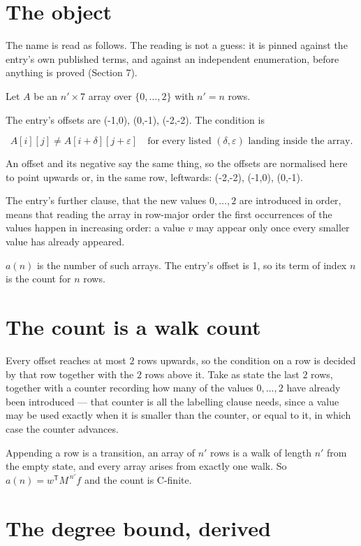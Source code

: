 \documentclass[11pt]{article}
\theoremstyle{definition}
\begin{document}
\section{The object}

The name is read as follows. The reading is not a guess: it is pinned against the entry's own published terms, and against an independent enumeration, before anything is proved (Section 7).

Let $A$ be an $n' \times 7$ array over $\{0,\dots,2\}$ with $n' = n$ rows.

The entry's offsets are (-1,0), (0,-1), (-2,-2). The condition is

\[A[i][j] \ne A[i{+}\delta][j{+}\varepsilon]\quad\text{for every listed }(\delta,\varepsilon)\text{ landing inside the array.}\]

An offset and its negative say the same thing, so the offsets are normalised here to point upwards or, in the same row, leftwards: (-2,-2), (-1,0), (0,-1).

The entry's further clause, that the new values $0,\dots,2$ are introduced in order, means that reading the array in row-major order the first occurrences of the values happen in increasing order: a value $v$ may appear only once every smaller value has already appeared.

$a(n)$ is the number of such arrays. The entry's offset is 1, so its term of index $n$ is the count for $n$ rows.

\section{The count is a walk count}

Every offset reaches at most $2$ rows upwards, so the condition on a row is decided by that row together with the $2$ rows above it. Take as state the last $2$ rows, together with a counter recording how many of the values $0,\dots,2$ have already been introduced --- that counter is all the labelling clause needs, since a value may be used exactly when it is smaller than the counter, or equal to it, in which case the counter advances.

Appending a row is a transition, an array of $n'$ rows is a walk of length $n'$ from the empty state, and every array arises from exactly one walk. So $a(n) = w^{\mathsf T}M^{\,n'}f$ and the count is C-finite.

\section{The degree bound, derived}
\end{document}
